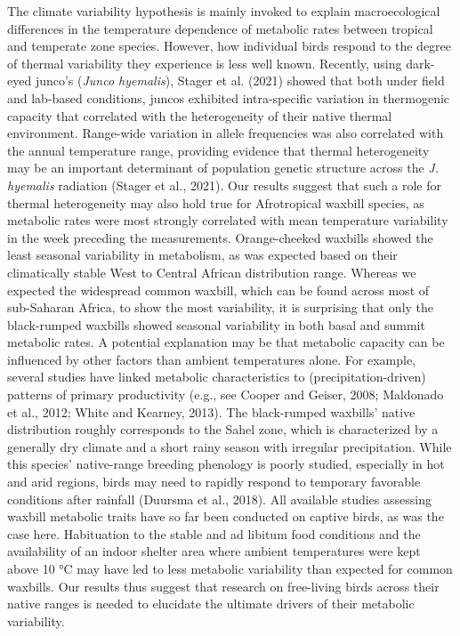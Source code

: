 \documentclass[10pt, twoside]{book} %
\begin{document}
The climate variability hypothesis is mainly invoked to explain macroecological differences in the temperature dependence of metabolic rates between tropical and temperate zone species. However, how individual birds respond to the degree of thermal variability they experience is less well known. Recently, using dark-eyed junco's (\textit{Junco hyemalis}), Stager et al. (2021) showed that both under field and lab-based conditions, juncos exhibited intra-specific variation in thermogenic capacity that correlated with the heterogeneity of their native thermal environment. Range-wide variation in allele frequencies was also correlated with the annual temperature range, providing evidence that thermal heterogeneity may be an important determinant of population genetic structure across the \textit{J. hyemalis} radiation (Stager et al., 2021). Our results suggest that such a role for thermal heterogeneity may also hold true for Afrotropical waxbill species, as metabolic rates were most strongly correlated with mean temperature variability in the week preceding the measurements. Orange-cheeked waxbills showed the least seasonal variability in metabolism, as was expected based on their climatically stable West to Central African distribution range. Whereas we expected the widespread common waxbill, which can be found across most of sub-Saharan Africa, to show the most variability, it is surprising that only the black-rumped waxbills showed seasonal variability in both basal and summit metabolic rates. A potential explanation may be that metabolic capacity can be influenced by other factors than ambient temperatures alone. For example, several studies have linked metabolic characteristics to (precipitation-driven) patterns of primary productivity (e.g., see Cooper and Geiser, 2008; Maldonado et al., 2012; White and Kearney, 2013). The black-rumped waxbills' native distribution roughly corresponds to the Sahel zone, which is characterized by a generally dry climate and a short rainy season with irregular precipitation. While this species' native-range breeding phenology is poorly studied, especially in hot and arid regions, birds may need to rapidly respond to temporary favorable conditions after rainfall (Duursma et al., 2018). All available studies assessing waxbill metabolic traits have so far been conducted on captive birds, as was the case here. Habituation to the stable and ad libitum food conditions and the availability of an indoor shelter area where ambient temperatures were kept above 10 °C may have led to less metabolic variability than expected for common waxbills. Our results thus suggest that research on free-living birds across their native ranges is needed to elucidate the ultimate drivers of their metabolic variability.\\
\end{document}
